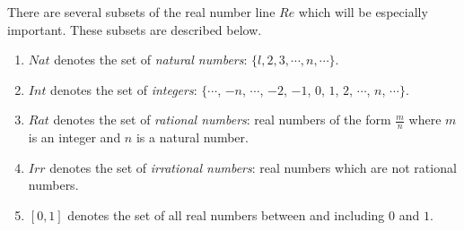\documentclass{book}
\begin{document}
There are several subsets of the real number line $Re$ which will be especially important. These subsets are described below.
\begin{enumerate}[\hspace{1cm}(1)]
  \item $Nat$ denotes the set of \emph{natural numbers}: $\{ l, 2, 3, \cdots , n, \cdots \}$.
  \item $Int$ denotes the set of \emph{integers}: $\{ \cdots$, $-n$, $\cdots$, $-2$, $-1$, $0$, $1$, $2$, $\cdots$, $n$, $\cdots \}$.
  \item $Rat$ denotes the set of \emph{rational numbers}: real numbers of the form $\frac{m}{n}$ where $m$ is an integer and $n$ is a natural number.
  \item $Irr$ denotes the set of \emph{irrational numbers}: real numbers which are not rational numbers.
  \item $[0,1]$ denotes the set of all real numbers between and including $0$ and $1$.
\end{enumerate}
\end{document}
